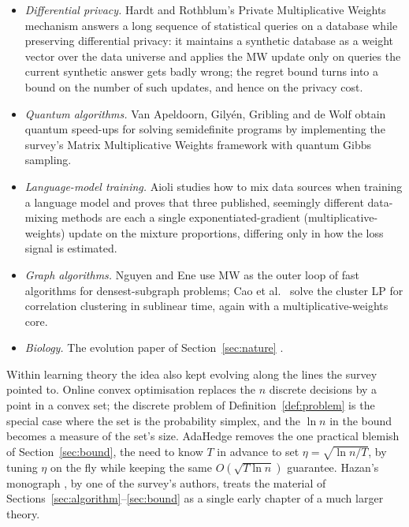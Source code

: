 \documentclass[11pt,a4paper]{article}
\theoremstyle{plain}
\theoremstyle{definition}
\newcommand{\sq}[1]{\sqrt{#1}}
\begin{document}
\begin{itemize}[itemsep=3pt]
  \item \emph{Differential privacy.} Hardt and Rothblum's Private Multiplicative Weights mechanism \cite{HR10} answers a long sequence of statistical queries on a database while preserving differential privacy: it maintains a synthetic database as a weight vector over the data universe and applies the MW update only on queries the current synthetic answer gets badly wrong; the regret bound turns into a bound on the number of such updates, and hence on the privacy cost.
  \item \emph{Quantum algorithms.} Van Apeldoorn, Gily\'en, Gribling and de Wolf \cite{vAGGdW17} obtain quantum speed-ups for solving semidefinite programs by implementing the survey's Matrix Multiplicative Weights framework \cite[Section~5]{AHK12} with quantum Gibbs sampling.
  \item \emph{Language-model training.} Aioli \cite{Aioli25} studies how to mix data sources when training a language model and proves that three published, seemingly different data-mixing methods are each a single exponentiated-gradient (multiplicative-weights) update on the mixture proportions, differing only in how the loss signal is estimated.
  \item \emph{Graph algorithms.} Nguyen and Ene \cite{NE24} use MW as the outer loop of fast algorithms for densest-subgraph problems; Cao et al.\ \cite{Cao25} solve the cluster LP for correlation clustering in sublinear time, again with a multiplicative-weights core.
  \item \emph{Biology.} The evolution paper of Section~\ref{sec:nature} \cite{CLPV14}.
\end{itemize}

Within learning theory the idea also kept evolving along the lines the survey pointed to. Online convex optimisation \cite{Zinkevich03} replaces the $n$ discrete decisions by a point in a convex set; the discrete problem of Definition~\ref{def:problem} is the special case where the set is the probability simplex, and the $\ln n$ in the bound becomes a measure of the set's size. AdaHedge \cite{AdaHedge14} removes the one practical blemish of Section~\ref{sec:bound}, the need to know $T$ in advance to set $\eta = \sq{\ln n/T}$, by tuning $\eta$ on the fly while keeping the same $O(\sq{T\ln n})$ guarantee. Hazan's monograph \cite{Hazan16}, by one of the survey's authors, treats the material of Sections~\ref{sec:algorithm}--\ref{sec:bound} as a single early chapter of a much larger theory.
\end{document}
